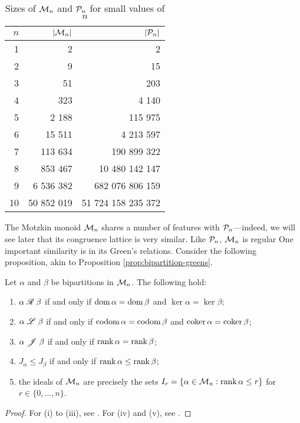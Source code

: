 \begin{table}[h]
  \centering
  \renewcommand\arraystretch{1.0}
  \begin{tabular}{| r | r | r |}
    \hline
    $n$ & $|\mathcal{M}_n|$ & $|\mathcal{P}_n|$ \\
    \hline
     1 &           2 &                  2 \\
     2 &           9 &                 15 \\
     3 &          51 &                203 \\
     4 &         323 &              4 140 \\
     5 &       2 188 &            115 975 \\
     6 &      15 511 &          4 213 597 \\
     7 &     113 634 &        190 899 322 \\
     8 &     853 467 &     10 480 142 147 \\
     9 &   6 536 382 &    682 076 806 159 \\
    10 &  50 852 019 & 51 724 158 235 372 \\
    \hline
  \end{tabular}
  \renewcommand\arraystretch{0.7}
  \caption{Sizes of $\mathcal{M}_n$ and $\mathcal{P}_n$ for small values of $n$}
  \label{tab:mn-size}
\end{table}

The Motzkin monoid $\mathcal{M}_n$ shares a number of features with $\mathcal{P}_n$---indeed,
we will see later that its congruence lattice is very similar.  Like $\mathcal{P}_n$,
$\mathcal{M}_n$ is regular One important
similarity is in its Green's relations.  Consider the following proposition,
akin to Proposition \ref{prop:bipartition-greens}.

\begin{proposition}
  \label{prop:mn-greens}
  Let $\alpha$ and $\beta$ be bipartitions in $\mathcal{M}_n$.  The following hold:
  \begin{enumerate}[\rm(i)]
  \item $\alpha \mathrel{\mathscr{R}} \beta$ if and only if $\operatorname{dom} \alpha = \operatorname{dom} \beta$ and
    $\ker \alpha = \ker \beta$;
  \item $\alpha \mathrel{\mathscr{L}} \beta$ if and only if $\operatorname{codom} \alpha = \operatorname{codom} \beta$ and
    $\operatorname{coker} \alpha = \operatorname{coker} \beta$;
  \item $\alpha \mathrel{\mathscr{J}} \beta$ if and only if $\operatorname{rank} \alpha = \operatorname{rank} \beta$;
  \item $J_\alpha \leq J_\beta$ if and only if $\operatorname{rank} \alpha \leq \operatorname{rank} \beta$;
  \item the ideals of $\mathcal{M}_n$ are precisely the sets
    $I_r=\{\alpha \in \mathcal{M}_n : \operatorname{rank} \alpha \leq r\}$ for
    $r \in \{0, \ldots, n\}$.
  \end{enumerate}
  \begin{proof}
    For (i) to (iii), see \cite[Theorem 2.4]{deg_motzkin}.  For (iv) and (v),
    see \cite[Proposition 2.6]{deg_motzkin}.
  \end{proof}
\end{proposition}


